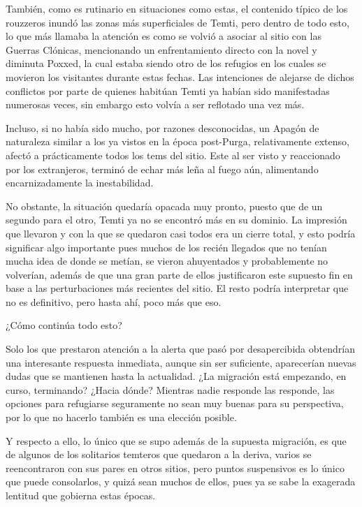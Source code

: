 \documentclass[
  spanish,
]{book}
\begin{document}
También, como es rutinario en situaciones como estas, el contenido típico de los rouzzeros inundó las zonas más superficiales de Temti, pero dentro de todo esto, lo que más llamaba la atención es como se volvió a asociar al sitio con las Guerras Clónicas, mencionando un enfrentamiento directo con la novel y diminuta Poxxed, la cual estaba siendo otro de los refugios en los cuales se movieron los visitantes durante estas fechas. Las intenciones de alejarse de dichos conflictos por parte de quienes habitúan Temti ya habían sido manifestadas numerosas veces, sin embargo esto volvía a ser reflotado una vez más.

Incluso, si no había sido mucho, por razones desconocidas, un Apagón de naturaleza similar a los ya vistos en la época post-Purga, relativamente extenso, afectó a prácticamente todos los tems del sitio. Este al ser visto y reaccionado por los extranjeros, terminó de echar más leña al fuego aún, alimentando encarnizadamente la inestabilidad.

No obstante, la situación quedaría opacada muy pronto, puesto que de un segundo para el otro, Temti ya no se encontró más en su dominio. La impresión que llevaron y con la que se quedaron casi todos era un cierre total, y esto podría significar algo importante pues muchos de los recién llegados que no tenían mucha idea de donde se metían, se vieron ahuyentados y probablemente no volverían, además de que una gran parte de ellos justificaron este supuesto fin en base a las perturbaciones más recientes del sitio. El resto podría interpretar que no es definitivo, pero hasta ahí, poco más que eso.

¿Cómo continúa todo esto?

Solo los que prestaron atención a la alerta que pasó por desapercibida obtendrían una interesante respuesta inmediata, aunque sin ser suficiente, aparecerían nuevas dudas que se mantienen hasta la actualidad. ¿La migración está empezando, en curso, terminando? ¿Hacia dónde? Mientras nadie responde las responde, las opciones para refugiarse seguramente no sean muy buenas para su perspectiva, por lo que no hacerlo también es una elección posible.

Y respecto a ello, lo único que se supo además de la supuesta migración, es que de algunos de los solitarios temteros que quedaron a la deriva, varios se reencontraron con sus pares en otros sitios, pero puntos suspensivos es lo único que puede consolarlos, y quizá sean muchos de ellos, pues ya se sabe la exagerada lentitud que gobierna estas épocas.
\end{document}
